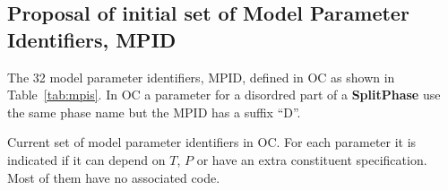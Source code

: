 \documentclass{article}
\begin{document}
\begin{appendices}

\newpage 

\section{Proposal of initial set of Model Parameter Identifiers, MPID}\label{sec:mpid2}

The 32 model parameter identifiers, MPID, defined in OC as shown in
Table~\ref{tab:mpis}.  In OC a parameter for a disordred part of a
{\bf SplitPhase} use the same phase name but the MPID has a suffix
``D''.

\begin{table}[!h]
  \caption{Current set of model parameter identifiers in OC.  For each
    parameter it is indicated if it can depend on $T$, $P$ or have an
    extra constituent specification.  Most of them have no associated
    code.}\label{tab:mpis}


\end{table}
\end{appendices}
\end{document}
